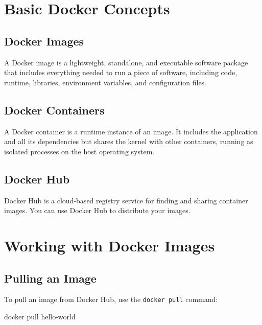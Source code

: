 \documentclass[
  letterpaper,
  DIV=11,
  numbers=noendperiod]{scrreprt}
\newenvironment{Shaded}{\begin{snugshade}}{\end{snugshade}}
\newcommand{\ExtensionTok}[1]{\textcolor[rgb]{0.00,0.23,0.31}{#1}}
\newcommand{\NormalTok}[1]{\textcolor[rgb]{0.00,0.23,0.31}{#1}}
\begin{document}
\section{Basic Docker Concepts}\label{basic-docker-concepts}

\subsection{Docker Images}\label{docker-images}

A Docker image is a lightweight, standalone, and executable software
package that includes everything needed to run a piece of software,
including code, runtime, libraries, environment variables, and
configuration files.

\subsection{Docker Containers}\label{docker-containers}

A Docker container is a runtime instance of an image. It includes the
application and all its dependencies but shares the kernel with other
containers, running as isolated processes on the host operating system.

\subsection{Docker Hub}\label{docker-hub}

Docker Hub is a cloud-based registry service for finding and sharing
container images. You can use Docker Hub to distribute your images.

\section{Working with Docker Images}\label{working-with-docker-images}

\subsection{Pulling an Image}\label{pulling-an-image}

To pull an image from Docker Hub, use the \texttt{docker\ pull} command:

\begin{Shaded}
\begin{Highlighting}[]
\ExtensionTok{docker}\NormalTok{ pull hello{-}world}
\end{Highlighting}
\end{Shaded}
\end{document}
